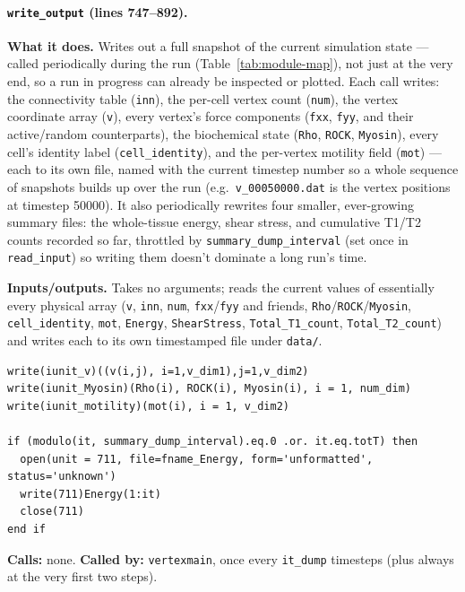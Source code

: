 \documentclass[11pt]{article}
\begin{document}
\paragraph{\texttt{write\_output} (lines 747--892).}
\textbf{What it does.} Writes out a full snapshot of the current simulation state ---
called periodically during the run (Table~\ref{tab:module-map}), not just at the very
end, so a run in progress can already be inspected or plotted. Each call writes: the
connectivity table (\texttt{inn}), the per-cell vertex count (\texttt{num}), the vertex
coordinate array (\texttt{v}), every vertex's force components (\texttt{fxx},
\texttt{fyy}, and their active/random counterparts), the biochemical state
(\texttt{Rho}, \texttt{ROCK}, \texttt{Myosin}), every cell's identity label
(\texttt{cell\_identity}), and the per-vertex motility field (\texttt{mot}) --- each to
its own file, named with the current timestep number so a whole sequence of snapshots
builds up over the run (e.g.\ \texttt{v\_00050000.dat} is the vertex positions at
timestep 50000). It also periodically rewrites four smaller, ever-growing summary
files: the whole-tissue energy, shear stress, and cumulative T1/T2 counts recorded so
far, throttled by \texttt{summary\_dump\_interval} (set once in \texttt{read\_input}) so
writing them doesn't dominate a long run's time.

\textbf{Inputs/outputs.} Takes no arguments; reads the current values of essentially
every physical array (\texttt{v}, \texttt{inn}, \texttt{num}, \texttt{fxx}/\texttt{fyy}
and friends, \texttt{Rho}/\texttt{ROCK}/\texttt{Myosin}, \texttt{cell\_identity},
\texttt{mot}, \texttt{Energy}, \texttt{ShearStress}, \texttt{Total\_T1\_count},
\texttt{Total\_T2\_count}) and writes each to its own timestamped file under
\texttt{data/}.

\begin{lstlisting}[caption={A representative slice of what \texttt{write\_output} writes every dump, and the throttled summary-file rewrite.}]
write(iunit_v)((v(i,j), i=1,v_dim1),j=1,v_dim2)
write(iunit_Myosin)(Rho(i), ROCK(i), Myosin(i), i = 1, num_dim)
write(iunit_motility)(mot(i), i = 1, v_dim2)

if (modulo(it, summary_dump_interval).eq.0 .or. it.eq.totT) then
  open(unit = 711, file=fname_Energy, form='unformatted', status='unknown')
  write(711)Energy(1:it)
  close(711)
end if
\end{lstlisting}

\textbf{Calls:} none. \textbf{Called by:} \texttt{vertexmain}, once every
\texttt{it\_dump} timesteps (plus always at the very first two steps).
\end{document}
